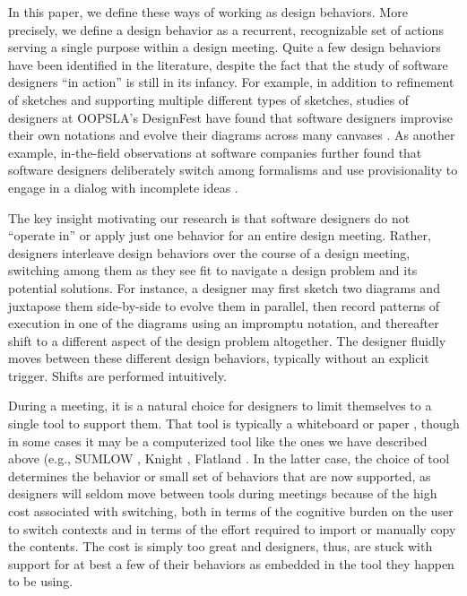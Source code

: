 In this paper, we define these ways of working as design behaviors. More precisely, we define a design behavior as a recurrent, recognizable set of actions serving a single purpose within a design meeting. Quite a few design behaviors have been identified in the literature, despite the fact that the study of software designers ``in action'' is still in its infancy. For example, in addition to refinement of sketches and supporting multiple different types of sketches, studies of designers at OOPSLA’s DesignFest have found that software designers improvise their own notations and evolve their diagrams across many canvases \cite{dekel2007notation}. As another example, in-the-field observations at software companies further found that software designers deliberately switch among formalisms and use provisionality to engage in a dialog with incomplete ideas \cite{petre2009insights}. 

The key insight motivating our research is that software designers do not ``operate in'' or apply just one behavior for an entire design meeting. Rather, designers interleave design behaviors over the course of a design meeting, switching among them as they see fit to navigate a design problem and its potential solutions. For instance, a designer may first sketch two diagrams and juxtapose them side-by-side to evolve them in parallel, then record patterns of execution in one of the diagrams using an impromptu notation, and thereafter shift to a different aspect of the design problem altogether. The designer fluidly moves between these different design behaviors, typically without an explicit trigger. Shifts are performed intuitively.

During a meeting, it is a natural choice for designers to limit themselves to a single tool to support them. That tool is typically a whiteboard or paper \cite{petre2009insights}, though in some cases it may be a computerized tool like the ones we have described above (e.g., SUMLOW \cite{chen2008sumlow}, Knight \cite{damm2000tool}, Flatland \cite{mynatt1999flatland}. In the latter case, the choice of tool determines the behavior or small set of behaviors that are now supported, as designers will seldom move between tools during meetings because of the high cost associated with switching, both in terms of the cognitive burden on the user to switch contexts and in terms of the effort required to import or manually copy the contents. The cost is simply too great and designers, thus, are stuck with support for at best a few of their behaviors as embedded in the tool they happen to be using.

